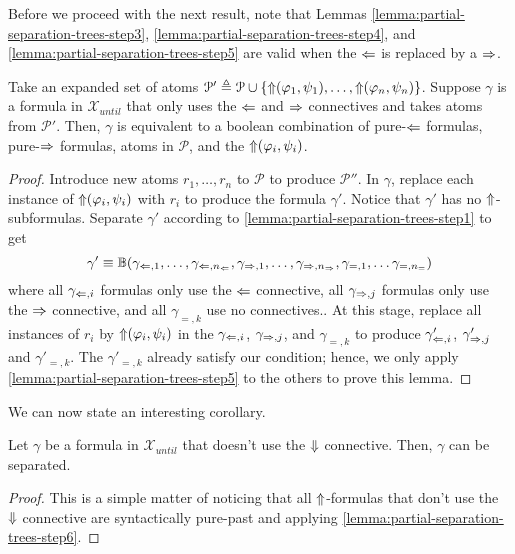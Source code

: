 \documentclass[a4paper,UKenglish,cleveref, autoref, thm-restate, numberwithinsect]{lipics-v2021}
\def\Larrow{\ensuremath\mathord{\Leftarrow}}
\def\Rarrow{\ensuremath\mathord{\Rightarrow}}
\def\Uarrow{\ensuremath\mathord{\Uparrow}}
\def\Darrow{\ensuremath\mathord{\Downarrow}}
\begin{document}
Before we proceed with the next result, note that Lemmas \ref{lemma:partial-separation-trees-step3}, \ref{lemma:partial-separation-trees-step4}, and \ref{lemma:partial-separation-trees-step5} are valid when the $\Larrow$ is replaced by a $\Rarrow$.
\begin{lemma}
    \label{lemma:partial-separation-trees-step6}
    Take an expanded set of atoms $\mathcal{P}' \triangleq \mathcal{P} \cup \{\Uarrow(\varphi_1, \psi_1), \ldots, \Uarrow(\varphi_n, \psi_n)\}$. Suppose $\gamma$ is a formula in $\mathcal{X}_{until}$ that only uses the $\Larrow$ and $\Rarrow$ connectives and takes atoms from $\mathcal{P}'$. Then, $\gamma$ is equivalent to a boolean combination of pure-$\Larrow$ formulas, pure-$\Rarrow$ formulas, atoms in $\mathcal{P}$, and the $\Uarrow(\varphi_i, \psi_i)$.
\end{lemma}
\begin{proof}
    Introduce new atoms $r_1, \ldots, r_n$ to $\mathcal{P}$ to produce $\mathcal{P}''$. In $\gamma$, replace each instance of $\Uarrow(\varphi_i, \psi_i)$ with $r_i$ to produce the formula $\gamma'$. Notice that $\gamma'$ has no $\Uarrow$-subformulas. Separate $\gamma'$ according to \cref{lemma:partial-separation-trees-step1} to get
    \begin{equation*}
        \gamma' \equiv \mathbb{B}(\gamma_{\Larrow, 1}, \ldots, \gamma_{\Larrow, n_{\Larrow}}, \gamma_{\Rarrow, 1}, \ldots, \gamma_{\Rarrow, n_{\Rarrow}}, \gamma_{=, 1}, \ldots \gamma_{=, n_=})
    \end{equation*}
    where all $\gamma_{\Larrow, i}$ formulas only use the $\Larrow$ connective, all $\gamma_{\Rarrow, j}$ formulas only use the $\Rarrow$ connective, and all $\gamma_{=, k}$ use no connectives.. At this stage, replace all instances of $r_i$ by $\Uarrow(\varphi_i, \psi_i)$ in the $\gamma_{\Larrow, i}$, $\gamma_{\Rarrow, j}$, and $\gamma_{=, k}$ to produce $\gamma'_{\Larrow, i}$, $\gamma'_{\Rarrow, j}$ and $\gamma'_{=, k}$. The $\gamma'_{=, k}$ already satisfy our condition; hence, we only apply \cref{lemma:partial-separation-trees-step5} to the others to prove this lemma.
\end{proof}
We can now state an interesting corollary.
\begin{corollary}
    \label{corollary:partial-separation-without-down}
    Let $\gamma$ be a formula in $\mathcal{X}_{until}$ that doesn't use the $\Darrow$ connective. Then, $\gamma$ can be separated.
\end{corollary}
\begin{proof}
    This is a simple matter of noticing that all $\Uarrow$-formulas that don't use the $\Darrow$ connective are syntactically pure-past and applying \cref{lemma:partial-separation-trees-step6}.
\end{proof}
\end{document}
